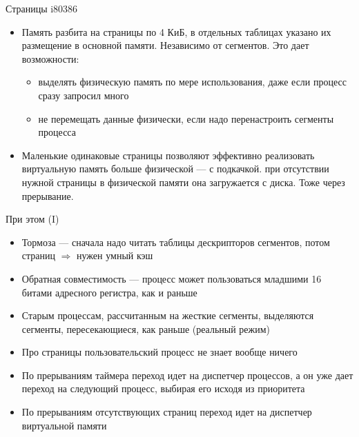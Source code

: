 \documentclass[xetex,aspectratio=43]{beamer}
\begin{document}
\begin{frame}{Страницы i80386}
    \begin{itemize}
        \tightlist
        \item
        Память разбита на страницы по 4 КиБ, в отдельных таблицах указано их
        размещение в основной памяти. Независимо от сегментов. Это дает
        возможности:

        \begin{itemize}
            \tightlist
            \item
            выделять физическую память по мере использования, даже если процесс
            сразу запросил много
            \item
            не перемещать данные физически, если надо перенастроить сегменты
            процесса
        \end{itemize}
        \item
        Маленькие одинаковые страницы позволяют эффективно реализовать
        виртуальную память больше физической --- с подкачкой. при отсутствии
        нужной страницы в физической памяти она загружается с диска. Тоже
        через прерывание.
    \end{itemize}
\end{frame}

\begin{frame}{При этом (I)}
    \begin{itemize}
        \tightlist
        \item
        Тормоза --- сначала надо читать таблицы дескрипторов сегментов, потом
        страниц \(\Rightarrow\) нужен умный кэш
        \item
        Обратная совместимость --- процесс может пользоваться младшими 16
        битами адресного регистра, как и раньше
        \item
        Старым процессам, рассчитанным на жесткие сегменты, выделяются
        сегменты, пересекающиеся, как раньше (реальный режим)
        \item
        Про страницы пользовательский процесс не знает вообще ничего
        \item
        По прерываниям таймера переход идет на диспетчер процессов, а он уже
        дает переход на следующий процесс, выбирая его исходя из приоритета
        \item
        По прерываниям отсутствующих страниц переход идет на диспетчер
        виртуальной памяти
    \end{itemize}
\end{frame}
\end{document}
